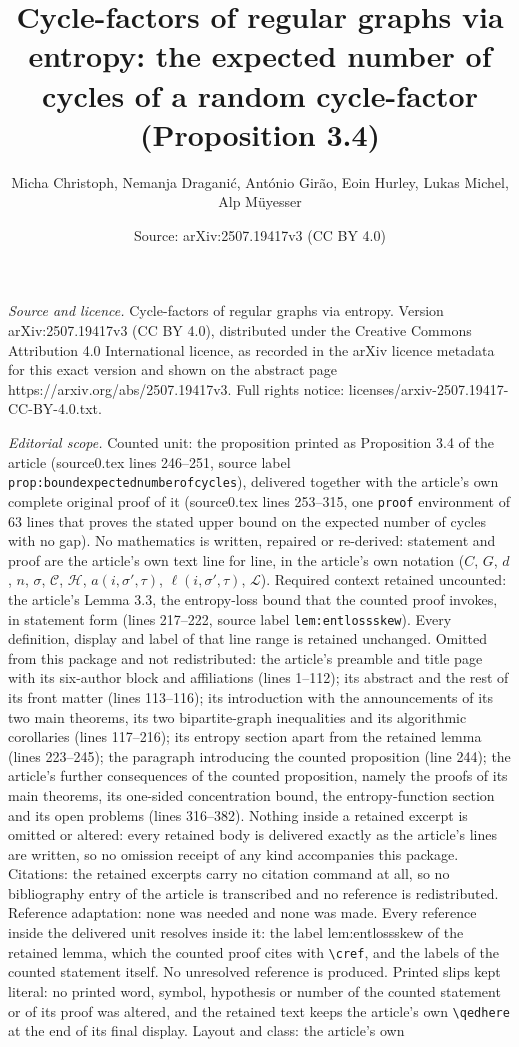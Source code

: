 \documentclass[10pt,a4paper]{amsart}
\title[Cycle-factors of regular graphs via entropy: the expected number of cycles (Proposition 3.4)]{Cycle-factors of regular graphs via entropy: the expected number of cycles of a random cycle-factor (Proposition 3.4)}
\author{Micha Christoph, Nemanja Dragani\'c, Ant\'onio Gir\~ao, Eoin Hurley, Lukas Michel, Alp M\"uyesser}
\date{Source: arXiv:2507.19417v3 (CC BY 4.0)}
\newcommand{\ent}{\mathcal{H}}
\newcommand{\cL}{\mathcal L}
\newcommand{\C}{\mathcal C}
\begin{document}
\maketitle

\noindent\emph{Source and licence.} Cycle-factors of regular graphs via entropy. Version arXiv:2507.19417v3 (CC BY 4.0), distributed under the Creative Commons Attribution 4.0 International licence, as recorded in the arXiv licence metadata for this exact version and shown on the abstract page https://arxiv.org/abs/2507.19417v3. Full rights notice: licenses/arxiv-2507.19417-CC-BY-4.0.txt.\par\smallskip

\noindent\textit{Editorial scope.} Counted unit: the proposition printed as Proposition 3.4 of the article (source0.tex lines 246--251, source label \texttt{prop:boundexpectednumberofcycles}), delivered together with the article's own complete original proof of it (source0.tex lines 253--315, one \texttt{proof} environment of 63 lines that proves the stated upper bound on the expected number of cycles with no gap). No mathematics is written, repaired or re-derived: statement and proof are the article's own text line for line, in the article's own notation ($C$, $G$, $d$, $n$, $\sigma$, $\C$, $\ent$, $a(i,\sigma',\tau)$, $\ell(i,\sigma',\tau)$, $\cL$). Required context retained uncounted: the article's Lemma 3.3, the entropy-loss bound that the counted proof invokes, in statement form (lines 217--222, source label \texttt{lem:entlossskew}). Every definition, display and label of that line range is retained unchanged. Omitted from this package and not redistributed: the article's preamble and title page with its six-author block and affiliations (lines 1--112); its abstract and the rest of its front matter (lines 113--116); its introduction with the announcements of its two main theorems, its two bipartite-graph inequalities and its algorithmic corollaries (lines 117--216); its entropy section apart from the retained lemma (lines 223--245); the paragraph introducing the counted proposition (line 244); the article's further consequences of the counted proposition, namely the proofs of its main theorems, its one-sided concentration bound, the entropy-function section and its open problems (lines 316--382). Nothing inside a retained excerpt is omitted or altered: every retained body is delivered exactly as the article's lines are written, so no omission receipt of any kind accompanies this package. Citations: the retained excerpts carry no citation command at all, so no bibliography entry of the article is transcribed and no reference is redistributed. Reference adaptation: none was needed and none was made. Every reference inside the delivered unit resolves inside it: the label lem:entlossskew of the retained lemma, which the counted proof cites with \texttt{\textbackslash cref}, and the labels of the counted statement itself. No unresolved reference is produced. Printed slips kept literal: no printed word, symbol, hypothesis or number of the counted statement or of its proof was altered, and the retained text keeps the article's own \texttt{\textbackslash qedhere} at the end of its final display. Layout and class: the article's own 
\end{document}
